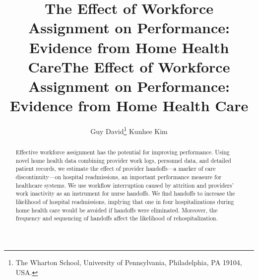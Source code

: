 \documentclass[final,12pt, notitlepage]{article}
\title{The Effect of Workforce Assignment on Performance: Evidence from Home Health Care}
\author{Guy David\thanks{The Wharton School, University of Pennsylvania, Philadelphia, PA 19104, USA.} \quad \quad Kunhee Kim\footnotemark[1]}
\title{The Effect of Workforce Assignment on Performance: Evidence from Home Health Care}
\date{\parbox{\linewidth}{\centering%
	May 2017 \hspace*{0cm} \endgraf\medskip
	}}
\begin{document}
\begin{singlespace}
\maketitle
\thispagestyle{empty}


\begin{abstract}
Effective workforce assignment has the potential for improving performance. Using novel home health data combining provider work logs, personnel data, and detailed patient records, we estimate the effect of provider handoffs---a marker of care discontinuity---on hospital readmissions, an important performance measure for healthcare systems. We use workflow interruption caused by attrition and providers' work inactivity as an instrument for nurse handoffs. We find handoffs to increase the likelihood of hospital readmissions, implying that one in four hospitalizations during home health care would be avoided if handoffs were eliminated. Moreover, the frequency and sequencing of handoffs affect the likelihood of rehospitalization.
\end{abstract}


\end{singlespace}
\end{document}
